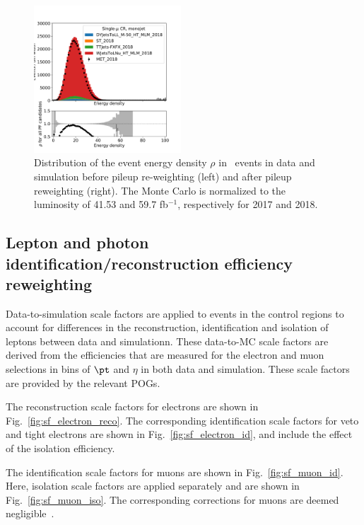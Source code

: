 \begin{figure}[ht!]
\begin{center}
    \includegraphics[width=0.49\textwidth]{fig/pileup/cr_1m_j_rho_all_2018.pdf}
    \caption{
        Distribution of the event energy density $\rho$  in \Wmn~events in data and
        simulation before pileup re-weighting (left) and after pileup reweighting (right).
        The Monte Carlo is normalized to the luminosity of 41.53 and 59.7 fb$^{-1}$, respectively for 2017 and 2018.
    }
    \label{fig:purwt_rho}
  \end{center}
\end{figure}

\subsection{Lepton and photon identification/reconstruction efficiency reweighting}

Data-to-simulation scale factors are applied to events in the control regions to
account for differences in the reconstruction, identification and isolation of leptons
between data and simulationn. These data-to-MC scale factors are derived from the efficiencies that are measured for the electron and muon
selections in bins of $\pt$ and $\eta$ in both data and simulation. These scale factors are
provided by the relevant POGs.


The reconstruction scale factors for electrons are shown in Fig.~\ref{fig:sf_electron_reco}. The corresponding identification scale factors for veto and tight electrons are shown in Fig.~\ref{fig:sf_electron_id}, and include the effect of the isolation efficiency. 

The identification scale factors for muons are shown in Fig.~\ref{fig:sf_muon_id}. Here, isolation scale factors are applied separately and are shown in Fig.~\ref{fig:sf_muon_iso}. The corresponding corrections for muons are deemed negligible~\cite{CMS-MUO-TWIKI-SF}.

